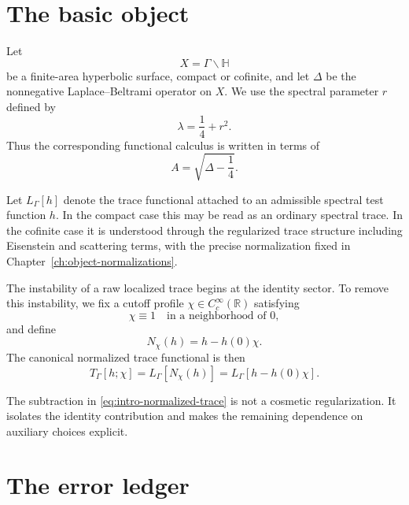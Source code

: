 \section{The basic object}
\label{sec:intro-basic-object}

Let
\begin{equation}
  X=\Gamma\backslash\mathbb H
  \label{eq:intro-surface}
\end{equation}
be a finite-area hyperbolic surface, compact or cofinite, and let \(\Delta\) be the nonnegative Laplace--Beltrami operator on \(X\).  We use the spectral parameter \(r\) defined by
\begin{equation}
  \lambda=\frac14+r^2.
  \label{eq:intro-spectral-parameter}
\end{equation}
Thus the corresponding functional calculus is written in terms of
\begin{equation}
  A=\sqrt{\Delta-\frac14}.
  \label{eq:intro-operator-A}
\end{equation}

Let \(L_\Gamma[h]\) denote the trace functional attached to an admissible spectral test function \(h\).  In the compact case this may be read as an ordinary spectral trace.  In the cofinite case it is understood through the regularized trace structure including Eisenstein and scattering terms, with the precise normalization fixed in Chapter~\ref{ch:object-normalizations}.

The instability of a raw localized trace begins at the identity sector.  To remove this instability, we fix a cutoff profile \(\chi\in C_c^\infty(\mathbb R)\) satisfying
\begin{equation}
  \chi\equiv1
  \quad\text{in a neighborhood of }0,
  \label{eq:intro-cutoff-normalization}
\end{equation}
and define
\begin{equation}
  N_\chi(h)=h-h(0)\chi.
  \label{eq:intro-normalized-test}
\end{equation}
The canonical normalized trace functional is then
\begin{equation}
  T_\Gamma[h;\chi]
  =
  L_\Gamma[N_\chi(h)]
  =
  L_\Gamma[h-h(0)\chi].
  \label{eq:intro-normalized-trace}
\end{equation}

The subtraction in \eqref{eq:intro-normalized-trace} is not a cosmetic regularization.  It isolates the identity contribution and makes the remaining dependence on auxiliary choices explicit.

\section{The error ledger}
\label{sec:intro-ledger}

